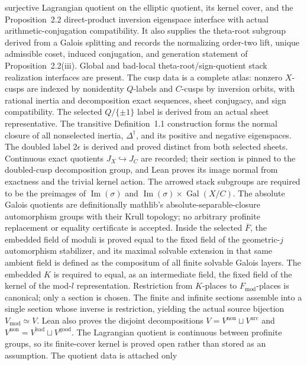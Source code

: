 \documentclass[11pt]{article}
\theoremstyle{plain}
\theoremstyle{definition}
\theoremstyle{remark}
\begin{document}
surjective Lagrangian quotient on the elliptic quotient, its kernel cover, and
the Proposition~2.2 direct-product inversion eigenspace interface with actual
arithmetic-conjugation compatibility.  It also supplies the
theta-root subgroup derived from a Galois splitting and records the normalizing
order-two lift, unique admissible coset, induced conjugation, and generation
statement of Proposition~2.2(iii).  Global and bad-local
theta-root/sign-quotient stack realization interfaces are present.  The cusp
data is a complete atlas: nonzero \(X\)-cusps are indexed by nonidentity
\(Q\)-labels and \(C\)-cusps by inversion orbits, with rational inertia and
decomposition exact sequences, sheet conjugacy, and sign compatibility.  The
selected \(Q/\{\pm1\}\) label is derived from an actual sheet representative.
The transitive Definition~1.1 construction forms the normal closure of all
nonselected inertia, \(\Delta^\dagger\), and its positive and negative
eigenspaces.  The doubled label \(2\epsilon\) is derived and proved distinct
from both selected sheets.  Continuous exact quotients
\(J_X\hookrightarrow J_C\) are recorded; their section is pinned to the
doubled-cusp decomposition group, and Lean proves its image normal from
exactness and the trivial kernel action.  The arrowed stack subgroups are
required to be the preimages of \(\operatorname{Im}(\sigma)\) and
\(\operatorname{Im}(\sigma)\times\operatorname{Gal}(X/C)\).  The absolute Galois quotients are definitionally
mathlib's absolute-separable-closure automorphism groups with their Krull topology;
no arbitrary profinite replacement or equality certificate is accepted.
Inside the selected \(\overline F\), the embedded field of moduli is proved
equal to the fixed field of the geometric-\(j\) automorphism stabilizer, and
its maximal solvable extension in that same ambient field is defined as the
compositum of all finite solvable Galois layers.  The embedded
\(K\) is required to equal, as an intermediate field, the fixed field of the
kernel of the mod-\(l\) representation.  Restriction from \(K\)-places to
\(F_{\mathrm{mod}}\)-places is canonical; only a section is chosen.  The finite
and infinite sections assemble into a single section whose inverse is
restriction, yielding the actual source bijection
\(V_{\mathrm{mod}}\simeq V\).  Lean also proves the disjoint decompositions
\(V=V^{\mathrm{non}}\sqcup V^{\mathrm{arc}}\) and
\(V^{\mathrm{non}}=V^{\mathrm{bad}}\sqcup V^{\mathrm{good}}\).
The Lagrangian quotient is
continuous between profinite groups, so its finite-cover kernel is proved
open rather than stored as an assumption.  The quotient data is attached only
\end{document}
